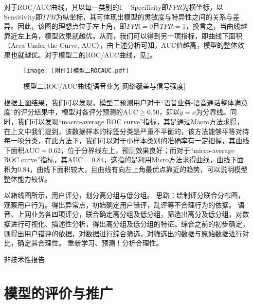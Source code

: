 \documentclass{MathorCupmodeling}
\begin{document}
\begin{itemize}
		对于ROC/AUC曲线，其以每一类别的$1-\mathrm{Specificity}$即$FPR$为横坐标，以$\mathrm{Sensitivity}$即$TPR$为纵坐标，其可体现出模型的灵敏度与特异性之间的关系与差异。因此，该图的理想点位于左上角，即$FPR=0$且$TPR=1$，换言之，当曲线越靠近左上角，模型效果就越优。从而，我们可以得到另一项指标，即曲线下面积（Area Under the Curve, AUC），由上述分析可知，AUC值越高，模型的整体效果也就越优。对于模型二的ROC/AUC曲线，见\textcolor{blue}{\cref{fig:SecondModelROCAUC}}。
		\begin{figure}[H]
			\centerline{\texttt{[image: [附件1]模型二ROCAUC.pdf]}}
			\caption{模型二ROC/AUC曲线[语音业务-网络覆盖与信号强度]}\label{fig:SecondModelROCAUC}
		\end{figure}
		根据上图结果，我们可以发现，模型二预测用户对于“语音业务-语音通话整体满意度”的评分结果中，模型对各评分预测的$\mathrm{AUC}\geqslant0.50$，即以$y=x$为分界线。同时，我们可以发现“macro-average ROC curve”指标，其是通过Macro方法求得，在上文中我们提到，该数据样本的标签分类是严重不平衡的，该方法能够平等对待每一项分类，在此方法下，我们可以对于小样本类别的准确率有一定把握，其曲线下面积$\mathrm{AUC}=0.62$，位于分界线左上，预测效果良好；而对于“micro-average ROC curve”指标，其$\mathrm{AUC}=0.84$，这指的是利用Micro方法求得曲线，曲线下面积为0.84，曲线下面积较大，且曲线有向左上角最优点靠近的趋势，可以说明模型整体能力较优。
	\end{itemize}


	以箱线图所示，用户评分，划分高分组与低分组。
	思路：绘制评分联合分布图，观察用户行为。得出异常点，初始确定用户错评，乱评等不合理行为的依据。
	语音、上网业务各四项评分，联合确定高分组及低分组，筛选出高分及低分组，对数据进行可视化、描述性分析，得出高分组及低分组的特征。综合之前的初步确定，则得出用户错评的依据，对数据进行综合筛选，对筛选出的数据与原始数据进行对比，确定其合理性。
	重新学习、预测！分析合理性。

	非技术性报告
	\section{模型的评价与推广}
\end{document}
